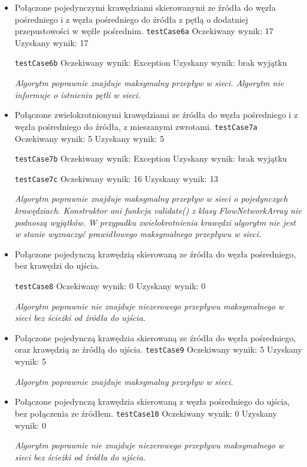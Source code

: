\begin{itemize}[nosep]
    \item Połączone pojedynczymi krawędziami skierowanymi ze źródła do węzła
    pośredniego i z węzła pośredniego do źródła z pętlą o dodatniej
    przepustowości w węźle pośrednim.
    \texttt{testCase6a}
    Oczekiwany wynik: 17
    Uzyskany wynik: 17

    \texttt{testCase6b}
    Oczekiwany wynik: Exception
    Uzyskany wynik: brak wyjątku

    \emph{Algorytm poprawnie znajduje maksymalny przepływ w sieci. Algorytm
    nie informuje o istnieniu pętli w sieci.}

    \item Połączone zwielokrotnionymi krawędziami ze źródła do węzła pośredniego
    i z węzła pośredniego do źródła, z mieszanymi zwrotami.
    \texttt{testCase7a}
    Oczekiwany wynik: 5
    Uzyskany wynik: 5

    \texttt{testCase7b}
    Oczekiwany wynik: Exception
    Uzyskany wynik: brak wyjątku

    \texttt{testCase7c}
    Oczekiwany wynik: 16
    Uzyskany wynik: 13

    \emph{Algorytm poprawnie znajduje maksymalny przepływ w sieci o pojedynczych
    krawędziach. Konstruktor ani funkcja validate() z klasy FlowNetworkArray
    nie podnoszą wyjątków. W przypadku zwielokrotnienia krawędzi algorytm nie jest
    w stanie wyznaczyć prawidłowego maksymalnego przepływu w sieci.}

    \item Połączone pojedynczą krawędzią skierowaną ze źródła do węzła
    pośredniego, bez krawędzi do ujścia.

    \texttt{testCase8}
    Oczekiwany wynik: 0
    Uzyskany wynik: 0

    \emph{Algorytm poprawnie nie znajduje niezerowego przepływu maksymalnego
    w sieci bez ścieżki od źródła do ujścia.}

    \item Połączone pojedynczą krawędzia skierowaną ze źródła do węzła
    pośredniego, oraz krawędzią ze źródłą do ujścia.
    \texttt{testCase9}
    Oczekiwany wynik: 5
    Uzyskany wynik: 5

    \emph{Algorytm poprawnie znajduje maksymalny przepływ w sieci.}

    \item Połączone pojedynczą krawędzia skierowaną z węzła pośredniego do
    ujścia, bez połączenia ze źródłem.
    \texttt{testCase10}
    Oczekiwany wynik: 0
    Uzyskany wynik: 0

    \emph{Algorytm poprawnie nie znajduje niezerowego przepływu maksymalnego
    w sieci bez ścieżki od źródła do ujścia.}
\end{itemize}


